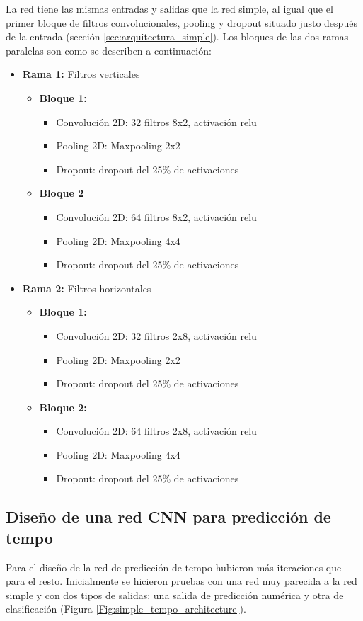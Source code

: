 La red tiene las mismas entradas y salidas que la red simple, al igual que el primer bloque de filtros convolucionales, pooling y dropout situado justo después de la entrada (sección \ref{sec:arquitectura_simple}). Los bloques de las dos ramas paralelas son como se describen a continuación:
\begin{itemize}
\item \textbf{Rama 1:} Filtros verticales
\begin{itemize}
\item \textbf{Bloque 1:}
\begin{itemize}
\item Convolución 2D: 32 filtros 8x2, activación relu
\item Pooling 2D: Maxpooling 2x2
\item Dropout: dropout del 25\% de activaciones
\end{itemize} 
\item \textbf{Bloque 2}
\begin{itemize}
\item Convolución 2D: 64 filtros 8x2, activación relu
\item Pooling 2D: Maxpooling 4x4
\item Dropout: dropout del 25\% de activaciones
\end{itemize} 
\end{itemize}
\item \textbf{Rama 2:} Filtros horizontales
\begin{itemize}
\item \textbf{Bloque 1:}
\begin{itemize}
\item Convolución 2D: 32 filtros 2x8, activación relu
\item Pooling 2D: Maxpooling 2x2
\item Dropout: dropout del 25\% de activaciones
\end{itemize} 
\item \textbf{Bloque 2:}
\begin{itemize}
\item Convolución 2D: 64 filtros 2x8, activación relu
\item Pooling 2D: Maxpooling 4x4
\item Dropout: dropout del 25\% de activaciones
\end{itemize} 
\end{itemize}
\end{itemize}

\subsection{Diseño de una red CNN para predicción de tempo}\label{sec:arquitectura_tempo}
\noindent Para el diseño de la red de predicción de tempo hubieron más iteraciones que para el resto. Inicialmente se hicieron pruebas con una red muy parecida a la red simple y con dos tipos de salidas: una salida de predicción numérica y otra de clasificación (Figura \ref{Fig:simple_tempo_architecture}).

